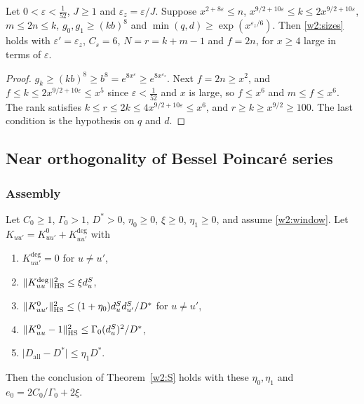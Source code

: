 \begin{lemma}\label{w2x:sizes}
Let $0<\varepsilon<\frac1{52}$, $J\ge1$ and $\varepsilon_z=\varepsilon/J$. Suppose $x^{2+8\varepsilon}\le n$, $x^{9/2+10\varepsilon}\le k\le2x^{9/2+10\varepsilon}$, $m\le2n\le k$, $g_0,g_1\ge(kb)^8$ and $\min(q,d)\ge\exp(x^{\varepsilon_z/6})$. Then \eqref{w2:sizes} holds with $\varepsilon'=\varepsilon_z$, $C_s=6$, $N=r=k+m-1$ and $f=2n$, for $x\ge4$ large in terms of $\varepsilon$.
\end{lemma}

\begin{proof}
$g_k\ge(kb)^8\ge b^8=e^{8x^\varepsilon}\ge e^{8x^{\varepsilon_z}}$. Next $f=2n\ge x^2$, and $f\le k\le2x^{9/2+10\varepsilon}\le x^5$ since $\varepsilon<\frac1{52}$ and $x$ is large, so $f\le x^6$ and $m\le f\le x^6$. The rank satisfies $k\le r\le2k\le4x^{9/2+10\varepsilon}\le x^6$, and $r\ge k\ge x^{9/2}\ge100$. The last condition is the hypothesis on $q$ and $d$.
\end{proof}



\subsection{Near orthogonality of Bessel Poincar\'e series}\label{w2:sec:S}

\subsubsection{Assembly}

\begin{proposition}\label{w2:assembly}
Let $C_0\ge1$, $\Gamma_0>1$, $D^*>0$, $\eta_0\ge0$, $\xi\ge0$, $\eta_1\ge0$, and assume \eqref{w2:window}. Let $K_{uu'}=K^0_{uu'}+K^{\deg}_{uu'}$ with
\begin{enumerate}[label=(\roman*),leftmargin=*]
\item $K^{\deg}_{uu'}=0$ for $u\ne u'$,
\item $\lVert K^{\deg}_{uu}\rVert_{\mathrm{HS}}^2\le\xi d^S_u$,
\item $\lVert K^0_{uu'}\rVert_{\mathrm{HS}}^2\le(1+\eta_0)d^S_ud^S_{u'}/D^*$ for $u\ne u'$,
\item $\lVert K^0_{uu}-1\rVert_{\mathrm{HS}}^2\le\Gamma_0(d^S_u)^2/D^*$,
\item $\lvert D_{\mathrm{all}}-D^*\rvert\le\eta_1D^*$.
\end{enumerate}
Then the conclusion of Theorem~\ref{w2:S} holds with these $\eta_0,\eta_1$ and $e_0=2C_0/\Gamma_0+2\xi$.
\end{proposition}

